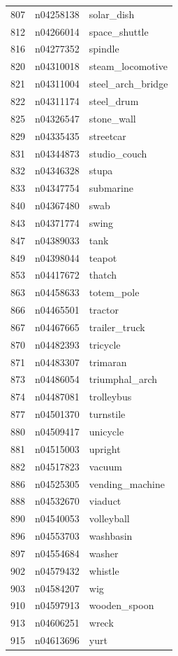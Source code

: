 \begin{table}
\begin{tabular}{cll}
807 & n04258138 & solar_dish \\
812 & n04266014 & space_shuttle \\
816 & n04277352 & spindle \\
820 & n04310018 & steam_locomotive \\
821 & n04311004 & steel_arch_bridge \\
822 & n04311174 & steel_drum \\
825 & n04326547 & stone_wall \\
829 & n04335435 & streetcar \\
831 & n04344873 & studio_couch \\
832 & n04346328 & stupa \\
833 & n04347754 & submarine \\
840 & n04367480 & swab \\
843 & n04371774 & swing \\
847 & n04389033 & tank \\
849 & n04398044 & teapot \\
853 & n04417672 & thatch \\
863 & n04458633 & totem_pole \\
866 & n04465501 & tractor \\
867 & n04467665 & trailer_truck \\
870 & n04482393 & tricycle \\
871 & n04483307 & trimaran \\
873 & n04486054 & triumphal_arch \\
874 & n04487081 & trolleybus \\
877 & n04501370 & turnstile \\
880 & n04509417 & unicycle \\
881 & n04515003 & upright \\
882 & n04517823 & vacuum \\
886 & n04525305 & vending_machine \\
888 & n04532670 & viaduct \\
890 & n04540053 & volleyball \\
896 & n04553703 & washbasin \\
897 & n04554684 & washer \\
902 & n04579432 & whistle \\
903 & n04584207 & wig \\
910 & n04597913 & wooden_spoon \\
913 & n04606251 & wreck \\
915 & n04613696 & yurt \\

\end{tabular}
\end{table}
